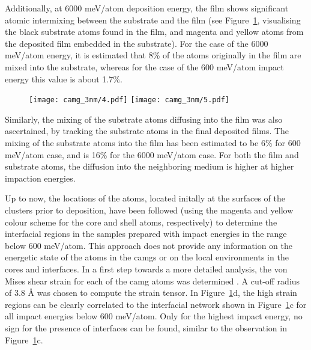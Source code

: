 \begin{changebar}
Additionally, at 6000 meV/atom deposition energy, the film shows significant atomic intermixing between the substrate and the film (see Figure~\ref{f:film_network}, visualising the black substrate atoms found in the film, and magenta and yellow atoms from the deposited film embedded in the substrate). For the case of the 6000 meV/atom energy, it is estimated that 8\% of the atoms originally in the film are mixed into the substrate, whereas for the case of the 600 meV/atom impact energy this value is about 1.7\%. \par

\begin{figure}[!h]	\centering
	\texttt{[image: camg\_3nm/4.pdf]}
	\texttt{[image: camg\_3nm/5.pdf]}
	\label{f:film_network}
\end{figure}

Similarly, the mixing of the substrate atoms diffusing into the film was also ascertained, by tracking the substrate atoms in the final deposited films. The mixing of the substrate atoms into the film has been estimated to be 6\% for 600 meV/atom case, and is 16\% for the 6000 meV/atom case. For both the film and substrate atoms, the diffusion into the neighboring medium is higher at higher impaction energies. \par

Up to now, the locations of the atoms, located initally at the surfaces of the clusters prior to deposition, have been followed (using the magenta and yellow colour scheme for the core and shell atoms, respectively) to determine the interfacial regions in the samples prepared with impact energies in the range below 600 meV/atom. This approach does not provide any information on the energetic state of the atoms in the \gls{camg}s or on the local environments in the cores and interfaces. In a first step towards a more detailed analysis, the von Mises shear strain for each of the \gls{camg} atoms was determined \cite{Stukowski2014}. A cut-off radius of 3.8 \r{A} was chosen to compute the strain tensor. In Figure~\ref{f:film_network}d, the high strain regions can be clearly correlated to the interfacial network shown in Figure~\ref{f:film_network}c for all impact energies below 600 meV/atom. Only for the highest impact energy, no sign for the presence of interfaces can be found, similar to the observation in Figure~\ref{f:film_network}c.  \par


\end{changebar}
